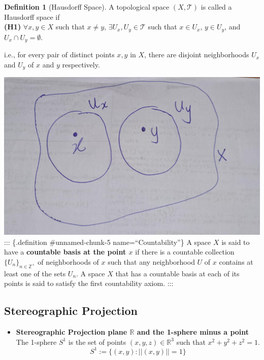 \documentclass[
]{book}
\providecommand{\tightlist}{%
  \setlength{\itemsep}{0pt}\setlength{\parskip}{0pt}}
\theoremstyle{definition}
\newtheorem{definition}{Definition}[chapter]
\theoremstyle{definition}
\theoremstyle{definition}
\theoremstyle{definition}
\theoremstyle{remark}
\begin{document}
\begin{definition}[Hausdorff Space]
\protect\hypertarget{def:unnamed-chunk-4}{}\label{def:unnamed-chunk-4}A topological space \((X,\mathcal{T})\) is called a Hausdorff space if\\
\textbf{(H1)} \(\forall x,y \in X\) such that \(x \neq y\), \(\exists U_x, U_y \in \mathcal{T}\) such that \(x \in U_x\), \(y \in U_y\), and \(U_x \cap U_y = \emptyset\).

i.e., for every pair of distinct points \(x, y\) in \(X\), there are disjoint neighborhoods \(U_x\) and \(U_y\) of \(x\) and \(y\) respectively.
\end{definition}

\includegraphics{figures/ch1/fig01.jpg}
::: \{.definition \#unnamed-chunk-5 name=``Countability''\}
A space \(X\) is said to have a \textbf{countable basis at the point \(x\)} if there is a countable collection \(\{U_n\}_{n\in\mathbb{Z}^+}\) of neighborhoods of \(x\) such that any neighborhood \(U\) of \(x\) contains at least one of the sets \(U_n\). A space \(X\) that has a countable basis at each of its points is said to satisfy the first countability axiom.
:::

\hypertarget{stereographic-projection}{%
\subsection{Stereographic Projection}\label{stereographic-projection}}

\begin{itemize}
\tightlist
\item
  \textbf{Stereographic Projection plane \(\mathbb{R}\) and the 1-sphere minus a point}\\
  The 1-sphere \(S^1\) is the set of points \((x,y,z) \in \mathbb{R}^3\) such that \(x^2 + y^2 + z^2 = 1\).
  \[S^1:=\{(x,y): ||(x,y)||=1\}\]
\end{itemize}
\end{document}
